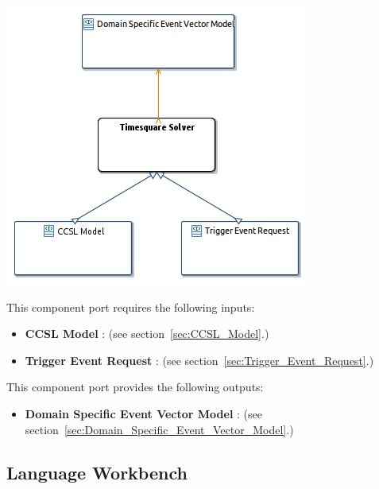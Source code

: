\documentclass{gemoc} %
\begin{document}

\begin{center}
\includegraphics*[trim=0.0cm 0.0cm 0cm 0.0cm, clip=true]{../images/generated/Generated_Timesquare_Solver.png}
\end{center}

This component port requires the following inputs:
\begin{itemize}
  \item \textbf{CCSL Model} :
(see section~\ref{sec:CCSL_Model}.)
  \item \textbf{Trigger Event Request} :
(see section~\ref{sec:Trigger_Event_Request}.)
\end{itemize}

This component port provides the following outputs:
\begin{itemize}
  \item \textbf{Domain Specific Event Vector Model} :
(see section~\ref{sec:Domain_Specific_Event_Vector_Model}.)
\end{itemize}




\subsection{Language Workbench}
\label{sec:Language_Workbench}
\end{document}
